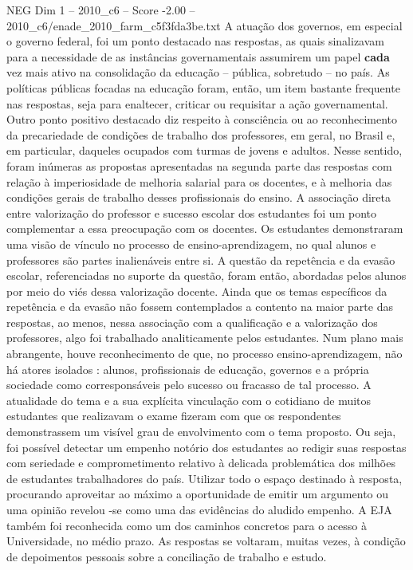 \begin{textsample}{NEG Dim 1 – 2010\_c6 – Score -2.00 – 2010\_c6/enade\_2010\_farm\_c5f3fda3be.txt}
A atuação dos governos, em especial o governo federal, foi um ponto destacado nas respostas, as quais sinalizavam para a necessidade de as instâncias governamentais assumirem um papel \textbf{cada} vez mais ativo na consolidação da educação – pública, sobretudo – no país.
As políticas públicas focadas na educação foram, então, um item bastante frequente nas respostas, seja para enaltecer, criticar ou requisitar a ação governamental.
Outro ponto positivo destacado diz respeito à consciência ou ao reconhecimento da precariedade de condições de trabalho dos professores, em geral, no Brasil e, em particular, daqueles ocupados com turmas de jovens e adultos.
Nesse sentido, foram inúmeras as propostas apresentadas na segunda parte das respostas com relação à imperiosidade de melhoria salarial para os docentes, e à melhoria das condições gerais de trabalho desses profissionais do ensino.
A associação direta entre valorização do professor e sucesso escolar dos estudantes foi um ponto complementar a essa preocupação com os docentes.
Os estudantes demonstraram uma visão de vínculo no processo de ensino-aprendizagem, no qual alunos e professores são partes inalienáveis entre si.
A questão da repetência e da evasão escolar, referenciadas no suporte da questão, foram então, abordadas pelos alunos por meio do viés dessa valorização docente.
Ainda que os temas específicos da repetência e da evasão não fossem contemplados a contento na maior parte das respostas, ao menos, nessa associação com a qualificação e a valorização dos professores, algo foi trabalhado analiticamente pelos estudantes.
Num plano mais abrangente, houve reconhecimento de que, no processo ensino-aprendizagem, não há atores isolados : alunos, profissionais de educação, governos e a própria sociedade como corresponsáveis pelo sucesso ou fracasso de tal processo.
A atualidade do tema e a sua explícita vinculação com o cotidiano de muitos estudantes que realizavam o exame fizeram com que os respondentes demonstrassem um visível grau de envolvimento com o tema proposto.
Ou seja, foi possível detectar um empenho notório dos estudantes ao redigir suas respostas com seriedade e comprometimento relativo à delicada problemática dos milhões de estudantes trabalhadores do país.
Utilizar todo o espaço destinado à resposta, procurando aproveitar ao máximo a oportunidade de emitir um argumento ou uma opinião revelou -se como uma das evidências do aludido empenho.
A EJA também foi reconhecida como um dos caminhos concretos para o acesso à Universidade, no médio prazo.
As respostas se voltaram, muitas vezes, à condição de depoimentos pessoais sobre a conciliação de trabalho e estudo.

\end{textsample}
